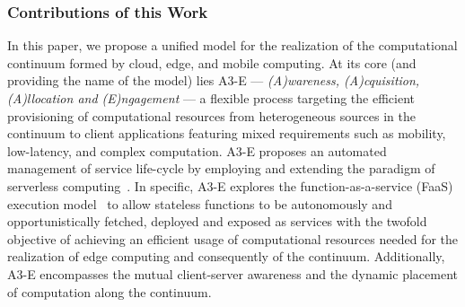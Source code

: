 %


\subsubsection*{Contributions of this Work}


In this paper, we propose a unified model for the realization of the computational continuum formed by cloud, edge, and mobile computing. At its core (and providing the name of the model) lies A3-E --- \textit{(A)wareness, (A)cquisition, (A)llocation and (E)ngagement} --- a flexible process targeting the efficient provisioning of computational resources from heterogeneous sources in the continuum to client applications featuring mixed requirements such as mobility, low-latency, and complex computation. 
A3-E proposes an automated management of service life-cycle by employing and extending the paradigm of serverless computing~\cite{Hendrickson:2016,baldini2017serverless,GarrigaMendonca2017}. In specific, A3-E explores the function-as-a-service (FaaS) execution model~\cite{MateosFaaster17} to allow stateless functions to be autonomously and opportunistically fetched, deployed and exposed as services with the twofold objective of achieving an efficient usage of computational resources needed for the realization of edge computing and consequently of the continuum. Additionally, A3-E encompasses the mutual client-server awareness and the dynamic placement of computation along the continuum.


